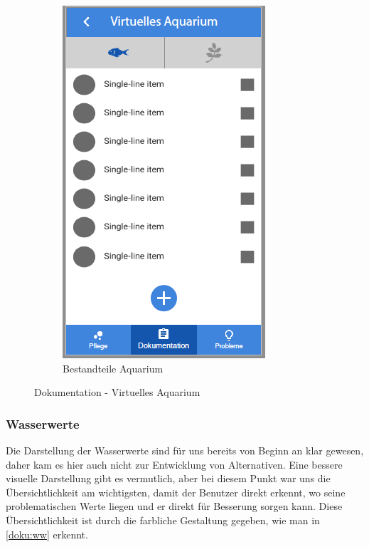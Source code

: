 \begin{figure}
\begin{subfigure}[b]{0.3\textwidth}
		\includegraphics[width=\textwidth]{virtuellesAquarium2}
		\caption{Bestandteile Aquarium}\label{doku:aq:c}
	\end{subfigure}	
	\caption{Dokumentation - Virtuelles Aquarium}
	\label{doku:va}
\end{figure}

\subsubsection{Wasserwerte}
Die Darstellung der Wasserwerte sind für uns bereits von Beginn an klar gewesen, daher kam es hier auch nicht zur Entwicklung von Alternativen. Eine bessere visuelle Darstellung gibt es vermutlich, aber bei diesem Punkt war uns die Übersichtlichkeit am wichtigsten, damit der Benutzer direkt erkennt, wo seine problematischen Werte liegen und er direkt für Besserung sorgen kann. Diese Übersichtlichkeit ist durch die farbliche Gestaltung gegeben, wie man in \ref{doku:ww} erkennt. 

